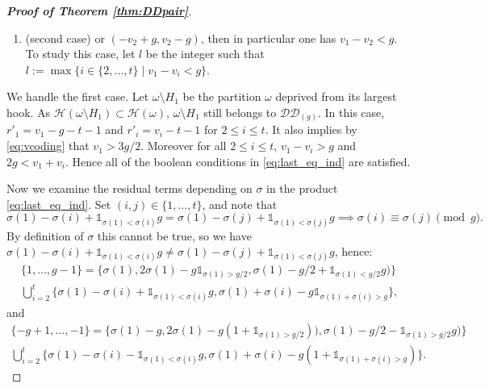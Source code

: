 \documentclass[11pt,letterpaper]{amsart}
\def\cch{\mathcal H}
\def\ccdd{\mathcal {DD}}
\numberwithin{equation}{section}
\numberwithin{df}{section}
\begin{document}
\begin{proof}[\textbf{Proof of Theorem \ref{thm:DDpair}}]
\begin{enumerate}
\item (second case) or $(-v_2+g,v_2-g)$, then in particular one has $v_1-v_2<g$. To study this case, let $l$ be the integer such that $l:=\max\lbrace i\in\lbrace 2,\dots, t\rbrace \mid v_1-v_i<g\rbrace$. 
\end{enumerate}

\noindent We handle the first case. Let $\omega\setminus H_1$ be the partition $\omega$ deprived from its largest hook. As $\cch(\omega\setminus H_1)\subset \cch(\omega)$, $\omega\setminus H_1$ still belongs to $\ccdd_{(g)}$. In this case, $r'_1=v_1-g-t-1$ and $r'_i=v_i-t-1$ for $2\leq i\leq t$. It also implies by \eqref{eq:vcoding} that $v_1>3g/2$. Moreover for all $2\leq i\leq t$, $v_1-v_i>g$ and $2g<v_1+v_i$. Hence all of the boolean conditions in \eqref{eq:last_eq_ind} are satisfied. 

Now we examine the residual terms depending on $\sigma$ in the product \eqref{eq:last_eq_ind}. Set $(i,j)\in \lbrace 1,\dots, t\rbrace$, and note that
\[\sigma(1)-\sigma(i)+\mathds{1}_{\sigma(1)<\sigma(i)}g= \sigma(1)-\sigma(j)+\mathds{1}_{\sigma(1)<\sigma(j)}g \implies \sigma(i) \equiv\sigma(j)\pmod g.\] 
\noindent By definition of $\sigma$ this cannot be true, so we have $\sigma(1)-\sigma(i)+\mathds{1}_{\sigma(1)<\sigma(i)}g\neq \sigma(1)-\sigma(j)+\mathds{1}_{\sigma(1)<\sigma(j)}g$, 
hence:
\begin{multline}\label{eq:residu}
\lbrace 1,\dots,g-1\rbrace=\lbrace \sigma(1), 2\sigma(1)-g\mathds{1}_{\sigma(1)>g/2},\sigma(1)-g/2+\mathds{1}_{\sigma(1)<g/2}g)\rbrace\\\bigcup_{i=2}^{t}\lbrace \sigma(1)-\sigma(i)+\mathds{1}_{\sigma(1)<\sigma(i)}g, \sigma(1)+\sigma(i)-g\mathds{1}_{\sigma(1)+\sigma(i)>g}\rbrace,
\end{multline}
and
\begin{multline}\label{eq:residuneg}
\lbrace -g+1,\dots,-1\rbrace=\lbrace \sigma(1)-g, 2\sigma(1)-g(1+\mathds{1}_{\sigma(1)>g/2})),\sigma(1)-g/2-\mathds{1}_{\sigma(1)>g/2}g)\rbrace\\\bigcup_{i=2}^{t}\lbrace \sigma(1)-\sigma(i)-\mathds{1}_{\sigma(1)<\sigma(i)}g, \sigma(1)+\sigma(i)-g(1+\mathds{1}_{\sigma(1)+\sigma(i)>g})\rbrace.
\end{multline}



\end{proof}
\end{document}
